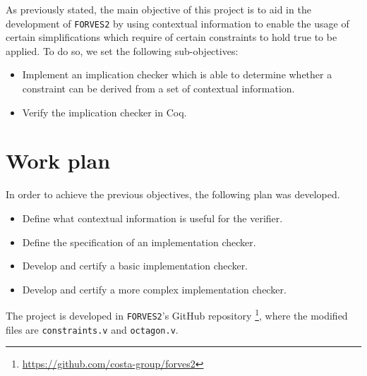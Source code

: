 As previously stated, the main objective of this project is to aid in the development of \verb|FORVES2|
by using contextual information to enable the usage of certain simplifications which require of certain
constraints to hold true to be applied. To do so, we set the following sub-objectives:

\begin{itemize}
    \item Implement an implication checker which is able to determine whether a constraint can be derived from a set of contextual information.
    \item Verify the implication checker in Coq.
\end{itemize}

\section{Work plan}
\label{sect:work-plan}

In order to achieve the previous objectives, the following plan was developed.

\begin{itemize}
    \item Define what contextual information is useful for the verifier.
    \item Define the specification of an implementation checker.
    \item Develop and certify a basic implementation checker.
    \item Develop and certify a more complex implementation checker.
\end{itemize}

The project is developed in \verb|FORVES2|'s GitHub repository
\footnote{\url{https://github.com/costa-group/forves2}}, where the modified files are
\verb|constraints.v| and \verb|octagon.v|.